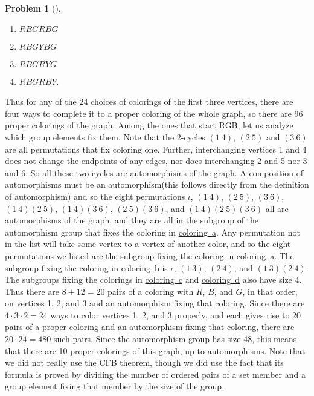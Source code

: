 \documentclass[10pt,]{book}
\theoremstyle{plain}
\theoremstyle{definition}
\newtheorem{activity}[project]{Problem}
\theoremstyle{definition}
\numberwithin{equation}{chapter}
\begin{document}
\begin{activity}[]
\begin{enumerate}[label=(\alph*)]
\item\hypertarget{coloring1}{}\(RBGRBG\)%
\item\hypertarget{coloring2}{}\(RBGYBG\)%
\item\hypertarget{coloring3}{}\(RBGRYG\)%
\item\hypertarget{coloring4}{}\(RBGRBY\).%
\end{enumerate}
 Thus for any of the 24 choices of colorings of the first three vertices, there are four ways to complete it to a proper coloring of the whole graph, so there are 96 proper colorings of the graph. Among the ones that start RGB, let us analyze which group elements fix them. Note that the 2-cycles \((1\ 4)\), \((2\ 5)\) and \((3\ 6)\) are all permutations that fix coloring one. Further, interchanging vertices 1 and 4 does not change the endpoints of any edges, nor does interchanging 2 and 5 nor 3 and 6. So all these two cycles are automorphisms of the graph. A composition of automorphisms must be an automorphism(this follows directly from the definition of automorphism) and so the eight permutations \(\iota\), \((1\ 4)\), \((2\ 5)\), \((3\ 6)\), \((1\ 4)(2\ 5)\), \((1\ 4)
(3\ 6)\), \((2\ 5)(3\ 6)\), and \((1\ 4)(2\ 5)(3\ 6)\) all are automorphisms of the graph, and they are all in the subgroup of the automorphism group that fixes the coloring in \hyperlink{coloring1}{coloring~a}. Any permutation not in the list will take some vertex to a vertex of another color, and so the eight permutations we listed are the subgroup fixing the coloring in \hyperlink{coloring1}{coloring~a}. The subgroup fixing the coloring in \hyperlink{coloring2}{coloring~b} is \(\iota\), \((1\ 3)\), \((2\ 4)\), and \((1\ 3)(2\ 4)\). The subgroups fixing the colorings in \hyperlink{coloring3}{coloring~c} and \hyperlink{coloring4}{coloring~d} also have size 4. Thus there are \(8+12=20\) pairs of a coloring with \(R\), \(B\), and \(G\), in that order, on vertices 1, 2, and 3 and an automorphism fixing that coloring. Since there are \(4\cdot3\cdot2=24\) ways to color vertices 1, 2, and 3 properly, and each gives rise to 20 pairs of a proper coloring and an automorphism fixing that coloring, there are \(20\cdot24=480\) such pairs. Since the automorphism group has size 48, this means that there are 10 proper colorings of this graph, up to automorphisms. Note that we did not really use the CFB theorem, though we did use the fact that its formula is proved by dividing the number of ordered pairs of a set member and a group element fixing that member by the size of the group.%
\end{activity}
\typeout{************************************************}
\typeout{************************************************}
\end{document}

